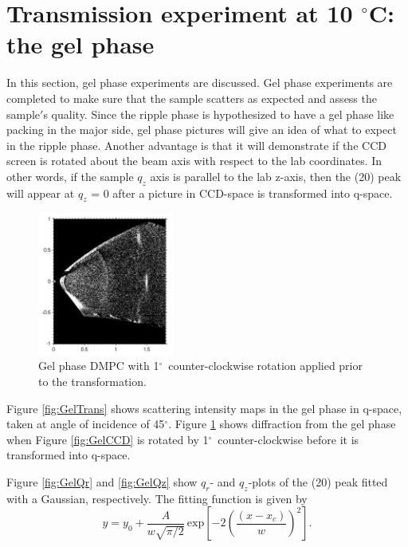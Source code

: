 \documentclass[letterpaper,12pt]{article}
\newcommand{\dg}{$^{\circ}$}%
\begin{document}
\newpage
\section{Transmission experiment at 10 \dg C: the gel phase}
In this section, gel phase experiments are discussed. Gel phase experiments are completed to make sure that the sample scatters as expected and assess the sample$'$s quality. Since the ripple phase is hypothesized to have a gel phase like packing in the major side, gel phase pictures will give an idea of what to expect in the ripple phase. Another advantage is that it will demonstrate if the CCD screen is rotated about the beam axis with respect to the lab coordinates. In other words, if the sample $q_z$ axis is parallel to the lab z-axis, then the (20) peak will appear at $q_z$ = 0 after a picture in CCD-space is transformed into q-space.
\begin{figure}[htbp]
	\centering
	\includegraphics[width=0.4\textwidth]{gel_t52_rot_trans}
	\caption[Intensity map of gel phase in q-space with 1\dg\ rotation]{Gel phase DMPC with 1\dg\ counter-clockwise rotation applied prior to the transformation.}
	\label{fig:GelTransRot}
\end{figure}

Figure \ref{fig:GelTrans} shows scattering intensity maps in the gel phase in q-space, taken at angle of incidence of 45\dg. Figure \ref{fig:GelTransRot} shows diffraction from the gel phase when Figure \ref{fig:GelCCD} is rotated by 1\dg\ counter-clockwise before it is transformed into q-space. 

Figure \ref{fig:GelQr} and \ref{fig:GelQz} show $q_r$- and $q_z$-plots of the (20) peak fitted with a Gaussian, respectively. The fitting function is given by
\begin{equation}
	y=y_0 + \frac{A}{w \sqrt{\pi /2}}\,\mathrm{exp}\left[ -2\left(\frac{(x-x_c)}{w}\right)^2\right].
\end{equation}	
\end{document}
